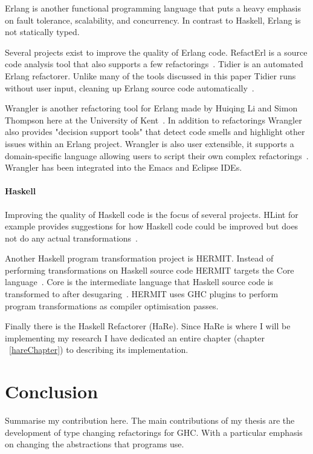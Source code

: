 Erlang is another functional programming language that puts a heavy emphasis on fault tolerance, scalability, and concurrency. In contrast to Haskell, Erlang is not statically typed.
 
Several projects exist to improve the quality of Erlang code. RefactErl is a source code analysis tool that also supports a few refactorings~\citep{refactErlWiki}. Tidier is an automated Erlang refactorer. Unlike many of the tools discussed in this paper Tidier runs without user input, cleaning up Erlang source code automatically~\citep{erlangTidier}.

Wrangler is another refactoring tool for Erlang made by Huiqing Li and Simon Thompson here at the University of Kent~\citep{refacTools}. In addition to refactorings Wrangler also provides "decision support tools" that detect code smells and highlight other issues within an Erlang project. Wrangler is also user extensible, it supports a domain-specific language allowing users to script their own complex refactorings~\citep{refacTools}. Wrangler has been integrated into the Emacs and Eclipse IDEs.

\subsubsection{Haskell}

Improving the quality of Haskell code is the focus of several projects. HLint for example provides suggestions for how Haskell code could be improved but does not do any actual transformations~\citep{hlint}.

Another Haskell program transformation project is HERMIT. Instead of performing transformations on Haskell source code HERMIT targets the Core language~\citep{hermit}. Core is the intermediate language that Haskell source code is transformed to after desugaring~\citep{ghcDesign}. HERMIT uses GHC plugins to perform program transformations as compiler optimisation passes. 

Finally there is the Haskell Refactorer (HaRe). Since HaRe is where I will be implementing my research I have dedicated an entire chapter (chapter ~\ref{hareChapter}) to describing its implementation. 


\chapter{Conclusion}
Summarise my contribution here. The main contributions of my thesis are the development of type changing refactorings for GHC. With a particular emphasis on changing the abstractions that programs use.



\cleardoublepage
{}
\label{index}
\printindex


